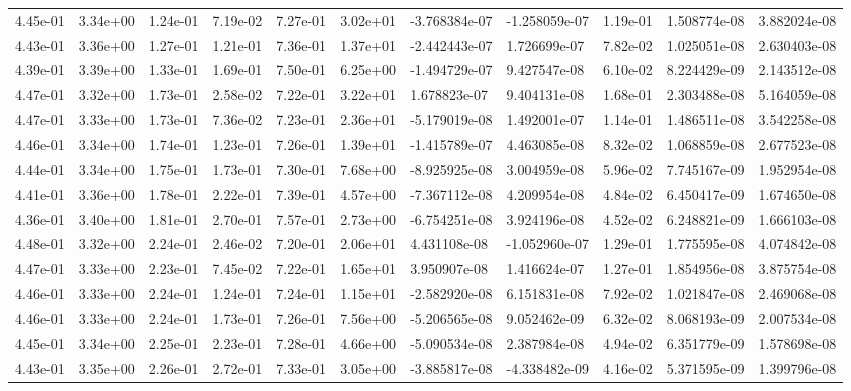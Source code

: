 \begin{longtable}{| p{} | p{} |}
4.45e-01 & 3.34e+00 & 1.24e-01 & 7.19e-02 & 7.27e-01 & 3.02e+01 & -3.768384e-07 & -1.258059e-07 &  1.19e-01 &  1.508774e-08 &  3.882024e-08 \\
4.43e-01 & 3.36e+00 & 1.27e-01 & 1.21e-01 & 7.36e-01 & 1.37e+01 & -2.442443e-07 &  1.726699e-07 &  7.82e-02 &  1.025051e-08 &  2.630403e-08 \\
4.39e-01 & 3.39e+00 & 1.33e-01 & 1.69e-01 & 7.50e-01 & 6.25e+00 & -1.494729e-07 &  9.427547e-08 &  6.10e-02 &  8.224429e-09 &  2.143512e-08 \\
4.47e-01 & 3.32e+00 & 1.73e-01 & 2.58e-02 & 7.22e-01 & 3.22e+01 &  1.678823e-07 &  9.404131e-08 &  1.68e-01 &  2.303488e-08 &  5.164059e-08 \\
4.47e-01 & 3.33e+00 & 1.73e-01 & 7.36e-02 & 7.23e-01 & 2.36e+01 & -5.179019e-08 &  1.492001e-07 &  1.14e-01 &  1.486511e-08 &  3.542258e-08 \\
4.46e-01 & 3.34e+00 & 1.74e-01 & 1.23e-01 & 7.26e-01 & 1.39e+01 & -1.415789e-07 &  4.463085e-08 &  8.32e-02 &  1.068859e-08 &  2.677523e-08 \\
4.44e-01 & 3.34e+00 & 1.75e-01 & 1.73e-01 & 7.30e-01 & 7.68e+00 & -8.925925e-08 &  3.004959e-08 &  5.96e-02 &  7.745167e-09 &  1.952954e-08 \\
4.41e-01 & 3.36e+00 & 1.78e-01 & 2.22e-01 & 7.39e-01 & 4.57e+00 & -7.367112e-08 &  4.209954e-08 &  4.84e-02 &  6.450417e-09 &  1.674650e-08 \\
4.36e-01 & 3.40e+00 & 1.81e-01 & 2.70e-01 & 7.57e-01 & 2.73e+00 & -6.754251e-08 &  3.924196e-08 &  4.52e-02 &  6.248821e-09 &  1.666103e-08 \\
4.48e-01 & 3.32e+00 & 2.24e-01 & 2.46e-02 & 7.20e-01 & 2.06e+01 &  4.431108e-08 & -1.052960e-07 &  1.29e-01 &  1.775595e-08 &  4.074842e-08 \\
4.47e-01 & 3.33e+00 & 2.23e-01 & 7.45e-02 & 7.22e-01 & 1.65e+01 &  3.950907e-08 &  1.416624e-07 &  1.27e-01 &  1.854956e-08 &  3.875754e-08 \\
4.46e-01 & 3.33e+00 & 2.24e-01 & 1.24e-01 & 7.24e-01 & 1.15e+01 & -2.582920e-08 &  6.151831e-08 &  7.92e-02 &  1.021847e-08 &  2.469068e-08 \\
4.46e-01 & 3.33e+00 & 2.24e-01 & 1.73e-01 & 7.26e-01 & 7.56e+00 & -5.206565e-08 &  9.052462e-09 &  6.32e-02 &  8.068193e-09 &  2.007534e-08 \\
4.45e-01 & 3.34e+00 & 2.25e-01 & 2.23e-01 & 7.28e-01 & 4.66e+00 & -5.090534e-08 &  2.387984e-08 &  4.94e-02 &  6.351779e-09 &  1.578698e-08 \\
4.43e-01 & 3.35e+00 & 2.26e-01 & 2.72e-01 & 7.33e-01 & 3.05e+00 & -3.885817e-08 & -4.338482e-09 &  4.16e-02 &  5.371595e-09 &  1.399796e-08 \\

\end{longtable}

